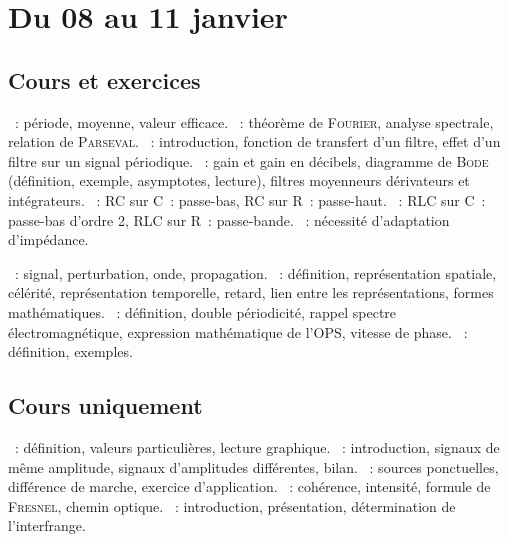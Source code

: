 \documentclass[a4paper, 12pt, final, garamond]{book}
\begin{document}
\setcounter{chapter}{12}

\chapter{Du 08 au 11 janvier}

\section{Cours et exercices}
\begin{enumerate}[label=\Roman*]
	~: période, moyenne, valeur efficace.
	~: théorème de
	\textsc{Fourier}, analyse spectrale, relation de \textsc{Parseval}.
	~: introduction, fonction de transfert d'un
	filtre, effet d'un filtre sur un signal périodique.
	~: gain et gain en décibels, diagramme
	de \textsc{Bode} (définition, exemple, asymptotes, lecture), filtres
	moyenneurs dérivateurs et intégrateurs.
	~: RC sur C~: passe-bas, RC sur R~:
	passe-haut.
	~: RLC sur C~: passe-bas d'ordre 2, RLC sur R~:
	passe-bande.
	~: nécessité d'adaptation d'impédance.
\end{enumerate}

\begin{enumerate}[label=\Roman*]
	~: signal, perturbation, onde, propagation.
	~: définition, représentation
	spatiale, célérité, représentation temporelle, retard, lien entre les
	représentations, formes mathématiques.
	~: définition, double
	périodicité, rappel spectre électromagnétique, expression mathématique
	de l'OPS, vitesse de phase.
	~: définition, exemples.
\end{enumerate}

\section{Cours uniquement}
\begin{enumerate}[label=\Roman*]
	~: définition, valeurs particulières,
	lecture graphique.
	~:
	introduction, signaux de même amplitude, signaux d'amplitudes
	différentes, bilan.
	~: sources ponctuelles,
	différence de marche, exercice d'application.
	~: cohérence, intensité, formule de
	\textsc{Fresnel}, chemin optique.
	~: introduction,
	présentation, détermination de l'interfrange.
\end{enumerate}
\end{document}
